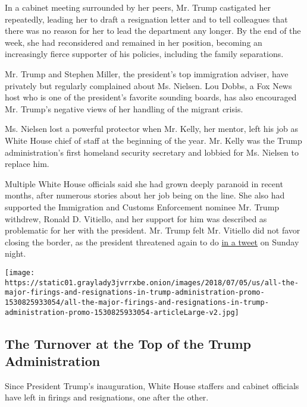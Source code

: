 In a cabinet meeting surrounded by her peers, Mr. Trump castigated her
repeatedly, leading her to draft a resignation letter and to tell
colleagues that there was no reason for her to lead the department any
longer. By the end of the week, she had reconsidered and remained in her
position, becoming an increasingly fierce supporter of his policies,
including the family separations.

Mr. Trump and Stephen Miller, the president's top immigration adviser,
have privately but regularly complained about Ms. Nielsen. Lou Dobbs, a
Fox News host who is one of the president's favorite sounding boards,
has also encouraged Mr. Trump's negative views of her handling of the
migrant crisis.

Ms. Nielsen lost a powerful protector when Mr. Kelly, her mentor, left
his job as White House chief of staff at the beginning of the year. Mr.
Kelly was the Trump administration's first homeland security secretary
and lobbied for Ms. Nielsen to replace him.

Multiple White House officials said she had grown deeply paranoid in
recent months, after numerous stories about her job being on the line.
She also had supported the Immigration and Customs Enforcement nominee
Mr. Trump withdrew, Ronald D. Vitiello, and her support for him was
described as problematic for her with the president. Mr. Trump felt Mr.
Vitiello did not favor closing the border, as the president threatened
again to do
\href{https://twitter.com/realDonaldTrump/status/1115053022974029824}{in
a tweet} on Sunday night.

\href{https://www.nytimes3xbfgragh.onion/interactive/2018/03/16/us/politics/all-the-major-firings-and-resignations-in-trump-administration.html}{}

\texttt{[image: https://static01.graylady3jvrrxbe.onion/images/2018/07/05/us/all-the-major-firings-and-resignations-in-trump-administration-promo-1530825933054/all-the-major-firings-and-resignations-in-trump-administration-promo-1530825933054-articleLarge-v2.jpg]}

\hypertarget{the-turnover-at-the-top-of-the-trump-administration}{%
\subsection{The Turnover at the Top of the Trump
Administration}\label{the-turnover-at-the-top-of-the-trump-administration}}

Since President Trump's inauguration, White House staffers and cabinet
officials have left in firings and resignations, one after the other.

